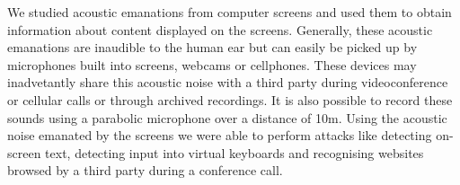 \documentclass[11pt]{report} %
\begin{document}
\begin{preliminary}
\begin{center}
    \end{center}
    
    \hfill

    \begin{center}
        \begin{minipage}{\textwidth}
            We studied acoustic emanations from computer screens and used them to obtain information about content displayed on the screens. Generally, these acoustic emanations are inaudible to the human ear but can easily be picked up by microphones built into screens, webcams or cellphones. These devices may inadvetantly share this acoustic noise with a third party during videoconference or cellular calls or through archived recordings. It is also possible to record these sounds using a parabolic microphone over a distance of 10m. Using the acoustic noise emanated by the screens we were able to perform attacks like detecting on-screen text, detecting input into virtual keyboards and recognising websites browsed by a third party during a conference call.  
        \end{minipage}
    \end{center}

    
    \clearpage
    \tableofcontents
    
    
    \clearpage
    \listoftables
    
    
    \clearpage
    \listoffigures
    
    
    
    \end{preliminary}
    
\end{document}
